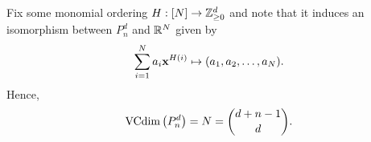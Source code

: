 \begin{ex}
\begin{enumerate}
\begin{enumerate}[1.]
\begin{enumerate}[1.]
                          Fix some monomial ordering $H: [N] \to \mathbb{Z}_{\geq 0}^d$
                          and note that it induces an isomorphism between
                          $P^d_n$ and $\mathbb{R}^N$ given by
                          \[
                            \sum_{i=1}^N a_i\mathbf{x}^{H(i)}
                            \mapsto
                            (a_1,a_2,\ldots,a_N).
                          \]
                          Hence,
                          \[
                            \operatorname{VCdim}\left(P^d_n\right)=N=\binom{d+n-1}{d}.
                          \]
                  \end{enumerate}
          \end{enumerate}
  \end{enumerate}
\end{ex}